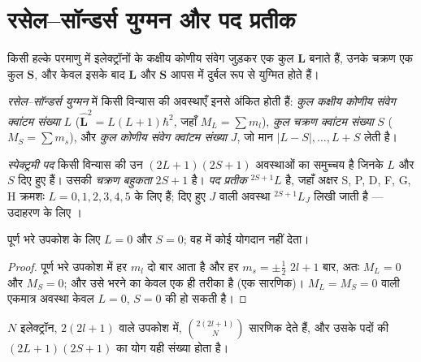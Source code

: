 \section{रसेल--सॉन्डर्स युग्मन और पद प्रतीक}

किसी हल्के परमाणु में इलेक्ट्रॉनों के कक्षीय कोणीय संवेग जुड़कर एक
कुल $\mathbf L$ बनाते हैं, उनके चक्रण एक कुल $\mathbf S$, और केवल इसके बाद
$\mathbf L$ और $\mathbf S$ आपस में दुर्बल रूप से युग्मित होते हैं।

\begin{definition}[रसेल--सॉन्डर्स युग्मन]\label{def:b3:many-electron-atoms:russell-saunders}
\emph{रसेल--सॉन्डर्स युग्मन} में
किसी विन्यास की अवस्थाएँ इनसे अंकित होती हैं: \emph{कुल कक्षीय कोणीय
संवेग क्वांटम संख्या}
$L$ ($\hat{\mathbf L}^2 = L(L+1)\hbar^2$, जहाँ $M_L = \sum m_l$), \emph{कुल
चक्रण क्वांटम संख्या} $S$ ($M_S = \sum m_s$),
और \emph{कुल कोणीय संवेग क्वांटम संख्या}
$J$, जो मान $|L - S|, \dots, L + S$ लेती है।
\end{definition}

\begin{definition}[स्पेक्ट्रमी पद, चक्रण बहुकता, पद प्रतीक]\label{def:b3:many-electron-atoms:term}
\emph{स्पेक्ट्रमी पद} किसी विन्यास की उन
$(2L+1)(2S+1)$ अवस्थाओं का समुच्चय है जिनके $L$ और $S$ दिए हुए हैं। उसकी
\emph{चक्रण बहुकता} $2S + 1$ है। \emph{पद प्रतीक}
 ${}^{2S+1}L$ है, जहाँ अक्षर S, P, D, F, G, H
क्रमशः $L = 0, 1, 2, 3, 4, 5$ के लिए हैं; दिए हुए $J$ वाली अवस्था ${}^{2S+1}L_J$ लिखी जाती है ---
उदाहरण के लिए ।
\end{definition}

\begin{proposition}[पूर्ण कोश]\label{prop:b3:many-electron-atoms:closed-shell}
पूर्ण भरे उपकोश के लिए $L = 0$ और $S = 0$; वह  में कोई
योगदान नहीं देता।
\end{proposition}

\begin{proof}
पूर्ण भरे उपकोश में हर $m_l$ दो बार आता है और हर $m_s = \pm\frac12$
$2l+1$ बार, अतः $M_L = 0$ और $M_S = 0$; और उसे भरने का केवल एक ही
तरीका है (एक सारणिक)। $M_L = M_S = 0$ वाली एकमात्र अवस्था केवल
$L = 0$, $S = 0$ की हो सकती है।
\end{proof}

\begin{proposition}[किसी विन्यास की अवस्थाओं की गिनती]\label{prop:b3:many-electron-atoms:count}
$N$ इलेक्ट्रॉन, $2(2l+1)$  वाले उपकोश में,
$\binom{2(2l+1)}{N}$ सारणिक देते हैं, और उसके पदों की  $(2L+1)(2S+1)$ का
योग यही संख्या होता है।
\end{proposition}

